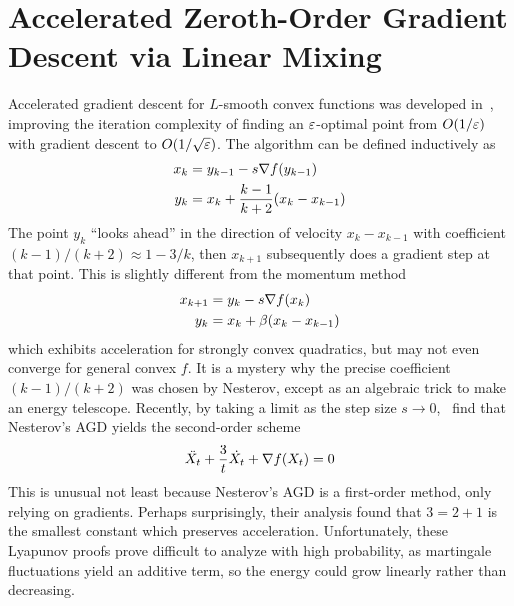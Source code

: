 
\chapter[Accelerated Zeroth-Order Gradient Descent]
{Accelerated Zeroth-Order Gradient Descent via Linear Mixing}
\label{chap:linear-mixing}
Accelerated gradient descent for $L$-smooth convex functions was developed in~\cite{nesterov1983method}, improving the iteration complexity of finding an $\varepsilon$-optimal point from $O(1/\varepsilon)$ with gradient descent to $O(1/\sqrt{\varepsilon})$. The algorithm can be defined inductively as 
\begin{align*}
    x_k &= y_{k-1} - s \nabla f(y_{k-1}) \\
    y_k &= x_k + \frac{k-1}{k+2}(x_k - x_{k-1})
\end{align*}
The point $y_k$ ``looks ahead'' in the direction of velocity $x_k - x_{k-1}$ with coefficient $(k-1)/(k+2) \approx 1 - 3/k$, then $x_{k+1}$ subsequently does a gradient step at that point. This is slightly different from the momentum method
\begin{align*}
    x_{k+1} &= y_k - s \nabla f(x_k) \\
    y_k &= x_k + \beta (x_k - x_{k-1})
\end{align*}
which exhibits acceleration for strongly convex quadratics, but may not even converge for general convex $f$. It is a mystery why the precise coefficient $(k-1)/(k+2)$ was chosen by Nesterov, except as an algebraic trick to make an energy telescope. Recently, by taking a limit as the step size $s \to 0$,~\citet{su2016differential} find that Nesterov's AGD yields the second-order scheme
\begin{align*}
    \ddot{X_t} + \frac{3}{t} \dot{X_t} + \nabla f(X_t) = 0
\end{align*}
This is unusual not least because Nesterov's AGD is a first-order method, only relying on gradients. Perhaps surprisingly, their analysis found that $3=2+1$ is the smallest constant which preserves acceleration. Unfortunately, these Lyapunov proofs prove difficult to analyze with high probability, as martingale fluctuations yield an additive term, so the energy could grow linearly rather than decreasing. 

